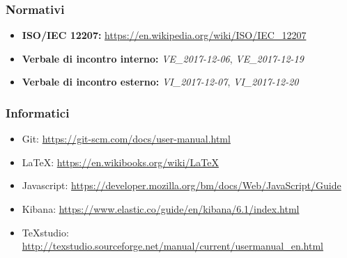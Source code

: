 	\subsubsection{Normativi}
		\begin{itemize}
			\item \textbf{ISO/IEC 12207:} \href{https://en.wikipedia.org/wiki/ISO/IEC\_12207}{https://en.wikipedia.org/wiki/ISO/IEC\_12207}
			\item \textbf{Verbale di incontro interno:} \emph{VE\_2017-12-06}, \emph{VE\_2017-12-19}
			\item \textbf{Verbale di incontro esterno:}	\emph{VI\_2017-12-07}, \emph{VI\_2017-12-20}	
		\end{itemize}
	\subsubsection{Informatici}
	\begin{itemize}
		\item Git:
		\href{https://git-scm.com/docs/user-manual.html}{https://git-scm.com/docs/user-manual.html}
		
		\item \LaTeX:  \href{https://en.wikibooks.org/wiki/LaTeX}{https://en.wikibooks.org/wiki/LaTeX}
		
		\item Javascript:
		\href{https://developer.mozilla.org/bm/docs/Web/JavaScript/Guide}{https://developer.mozilla.org/bm/docs/Web/JavaScript/Guide}
		
		\item Kibana: \href{https://www.elastic.co/guide/en/kibana/6.1/index.html}{https://www.elastic.co/guide/en/kibana/6.1/index.html}
		
		\item TeXstudio: 
		\href{http://texstudio.sourceforge.net/manual/current/usermanual\_en.html}{http://texstudio.sourceforge.net/manual/current/usermanual\_en.html}
	\end{itemize}
	